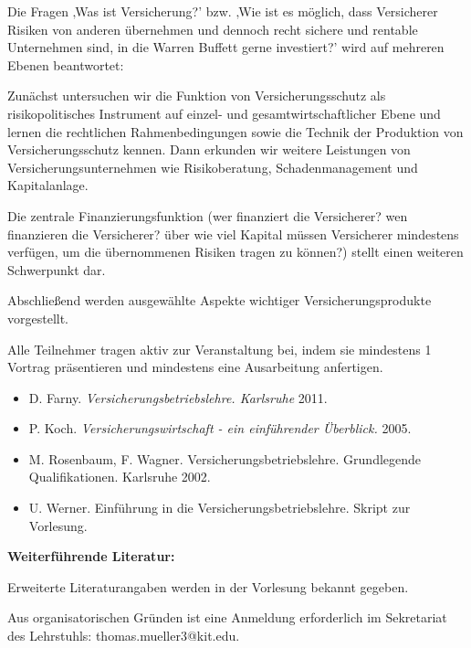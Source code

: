 \begin{course}
\begin{content}
Die Fragen ‚Was ist Versicherung?’ bzw. ‚Wie ist es möglich, dass Versicherer Risiken von anderen übernehmen und dennoch recht sichere und rentable Unternehmen sind, in die Warren Buffett gerne investiert?’ wird auf mehreren Ebenen beantwortet:

 

Zunächst untersuchen wir die Funktion von Versicherungsschutz als risikopolitisches Instrument auf einzel- und gesamtwirtschaftlicher Ebene und lernen die rechtlichen Rahmenbedingungen sowie die Technik der Produktion von Versicherungsschutz kennen. Dann erkunden wir weitere Leistungen von Versicherungsunternehmen wie Risikoberatung, Schadenmanagement und Kapitalanlage.

 

Die zentrale Finanzierungsfunktion (wer finanziert die Versicherer? wen finanzieren die Versicherer? über wie viel Kapital müssen Versicherer mindestens verfügen, um die übernommenen Risiken tragen zu können?) stellt einen weiteren Schwerpunkt dar.

 

Abschließend werden ausgewählte Aspekte wichtiger Versicherungsprodukte vorgestellt.

 

Alle Teilnehmer tragen aktiv zur Veranstaltung bei, indem sie mindestens 1 Vortrag präsentieren und mindestens eine Ausarbeitung anfertigen.


\end{content}



\begin{literature}\begin{itemize}\item D. Farny. \emph{Versicherungsbetriebslehre. Karlsruhe} 2011.  \item P. Koch. \emph{Versicherungswirtschaft - ein einführender Überblick.} 2005.  \item M. Rosenbaum, F. Wagner. Versicherungsbetriebslehre. Grundlegende Qualifikationen. Karlsruhe 2002.  \item U. Werner. Einführung in die Versicherungsbetriebslehre. Skript zur Vorlesung.  \end{itemize}

\textbf{Weiterführende Literatur:}

 

Erweiterte Literaturangaben werden in der Vorlesung bekannt gegeben.

\end{literature}

\begin{remarks}Aus organisatorischen Gründen ist eine Anmeldung erforderlich im Sekretariat des Lehrstuhls: thomas.mueller3@kit.edu.

\end{remarks}

\end{course}
